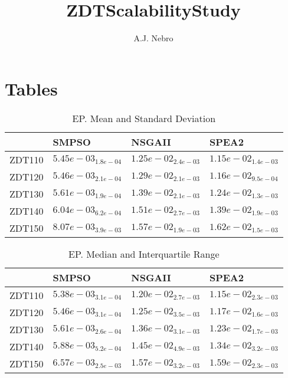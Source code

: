 \documentclass{article}
\title{ZDTScalabilityStudy}
\author{A.J. Nebro}
\begin{document}
\maketitle
\section{Tables}

\begin{table}
\caption{EP. Mean and Standard Deviation}
\label{table: EP}
\centering
\begin{scriptsize}
\begin{tabular}{llll}
\hline & SMPSO & NSGAII &  SPEA2\\
\hline 
ZDT110 & \cellcolor{gray95}$  5.45e-03_{ 1.8e-04}$ & $  1.25e-02_{ 2.4e-03}$ & \cellcolor{gray25}$  1.15e-02_{ 1.4e-03}$ \\
ZDT120 & \cellcolor{gray95}$  5.46e-03_{ 2.1e-04}$ & $  1.29e-02_{ 2.1e-03}$ & \cellcolor{gray25}$  1.16e-02_{ 9.5e-04}$ \\
ZDT130 & \cellcolor{gray95}$  5.61e-03_{ 1.9e-04}$ & $  1.39e-02_{ 2.1e-03}$ & \cellcolor{gray25}$  1.24e-02_{ 1.3e-03}$ \\
ZDT140 & \cellcolor{gray95}$  6.04e-03_{ 6.2e-04}$ & $  1.51e-02_{ 2.7e-03}$ & \cellcolor{gray25}$  1.39e-02_{ 1.9e-03}$ \\
ZDT150 & \cellcolor{gray95}$  8.07e-03_{ 3.9e-03}$ & \cellcolor{gray25}$  1.57e-02_{ 1.9e-03}$ & $  1.62e-02_{ 1.5e-03}$ \\
\hline
\end{tabular}
\end{scriptsize}
\end{table}

\begin{table}
\caption{EP. Median and Interquartile Range}
\label{table: EP}
\centering
\begin{scriptsize}
\begin{tabular}{llll}
\hline & SMPSO & NSGAII &  SPEA2\\
\hline 
ZDT110 & \cellcolor{gray95}$  5.38e-03_{ 3.1e-04}$ & $  1.20e-02_{ 2.7e-03}$ & \cellcolor{gray25}$  1.15e-02_{ 2.3e-03}$ \\
ZDT120 & \cellcolor{gray95}$  5.46e-03_{ 3.1e-04}$ & $  1.25e-02_{ 3.5e-03}$ & \cellcolor{gray25}$  1.17e-02_{ 1.6e-03}$ \\
ZDT130 & \cellcolor{gray95}$  5.61e-03_{ 2.6e-04}$ & $  1.36e-02_{ 3.1e-03}$ & \cellcolor{gray25}$  1.23e-02_{ 1.7e-03}$ \\
ZDT140 & \cellcolor{gray95}$  5.88e-03_{ 5.2e-04}$ & $  1.45e-02_{ 4.9e-03}$ & \cellcolor{gray25}$  1.34e-02_{ 3.2e-03}$ \\
ZDT150 & \cellcolor{gray95}$  6.57e-03_{ 2.5e-03}$ & \cellcolor{gray25}$  1.57e-02_{ 3.2e-03}$ & $  1.59e-02_{ 2.3e-03}$ \\
\hline
\end{tabular}
\end{scriptsize}
\end{table}
\end{document}
